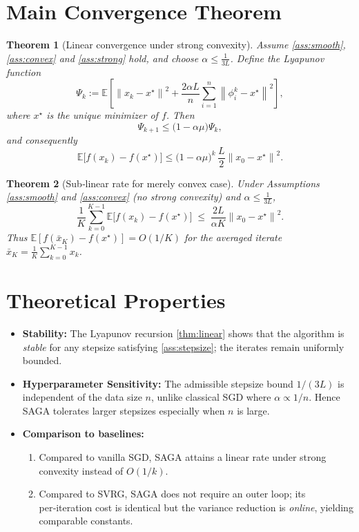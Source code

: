 \documentclass[12pt]{article}
\newtheorem{theorem}{Theorem}
\newcommand{\E}{\mathbb{E}}
\newcommand{\norm}[1]{\left\| #1\right\|}
\begin{document}
\section*{Main Convergence Theorem}
\begin{theorem}[Linear convergence under strong convexity]\label{thm:linear}
Assume \ref{ass:smooth}, \ref{ass:convex} and \ref{ass:strong} hold, and choose $\alpha\le \frac{1}{3L}$.  
Define the Lyapunov function
\[
\Psi_k:=\E\!\left[\norm{x_k-x^{\star}}^{2}
+\frac{2\alpha L}{n}\sum_{i=1}^{n}\norm{\phi_i^{k}-x^{\star}}^{2}\right],
\]
where $x^{\star}$ is the unique minimizer of $f$. Then
\[
\Psi_{k+1}\le \bigl(1-\alpha\mu\bigr)\Psi_{k},
\]
and consequently
\[
\E\!\bigl[f(x_k)-f(x^{\star})\bigr]\le
\bigl(1-\alpha\mu\bigr)^{k}\,\frac{L}{2}\norm{x_0-x^{\star}}^{2}.
\tag{4}
\]
\end{theorem}
\begin{theorem}[Sub‑linear rate for merely convex case]\label{thm:sublinear}
Under Assumptions \ref{ass:smooth} and \ref{ass:convex} (no strong convexity) and $\alpha\le \frac{1}{3L}$,
\[
\frac{1}{K}\sum_{k=0}^{K-1}\E\!\bigl[f(x_k)-f(x^{\star})\bigr]
\;\le\;
\frac{2L}{\alpha K}\norm{x_0-x^{\star}}^{2}.
\tag{5}
\]
Thus $ \E[f(\bar x_K)-f(x^{\star})]=O(1/K)$ for the averaged iterate $\bar x_K=\frac1K\sum_{k=0}^{K-1}x_k$.
\end{theorem}

\section*{Theoretical Properties}
\begin{itemize}[leftmargin=*]
\item \textbf{Stability:} The Lyapunov recursion \eqref{thm:linear} shows that the algorithm is \emph{stable} for any stepsize satisfying \ref{ass:stepsize}; the iterates remain uniformly bounded.
\item \textbf{Hyperparameter Sensitivity:} The admissible stepsize bound $1/(3L)$ is independent of the data size $n$, unlike classical SGD where $\alpha\propto 1/n$. Hence SAGA tolerates larger stepsizes especially when $n$ is large.
\item \textbf{Comparison to baselines:}
    \begin{enumerate}
        \item Compared to vanilla SGD, SAGA attains a linear rate under strong convexity instead of $O(1/k)$.
        \item Compared to SVRG, SAGA does not require an outer loop; its per‑iteration cost is identical but the variance reduction is \emph{online}, yielding comparable constants.
    \end{enumerate}
\end{itemize}
\end{document}
